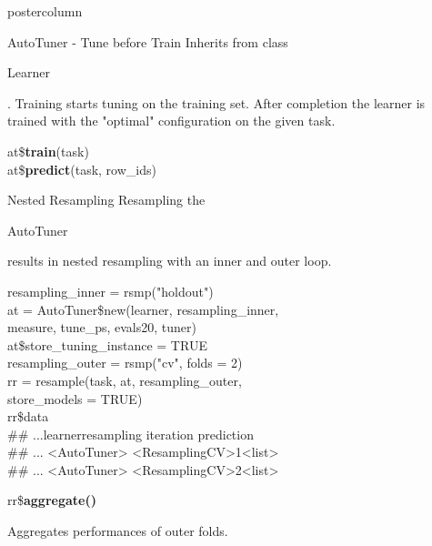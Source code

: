 \documentclass{beamer}
\newcommand{\codeinline}[1]{\begin{codeboxinline}#1\end{codeboxinline}}
\newcommand{\monospace}[1]{\multido{}{#1}{\space}}
\begin{document}
\begin{frame}[fragile]{}
\begin{columns}
\begin{column}{.245\textwidth}
\begin{beamercolorbox}[center]{postercolumn}
\begin{minipage}{.98\textwidth}
{\begin{myblock}{AutoTuner - Tune before Train}
							Inherits from class \codeinline{Learner}.
							Training starts tuning on the training set.
							After completion the learner is trained with the "optimal" configuration on the given task.
							\\
							\begin{codeboxmultiline}[width=16.5cm]
								at\$\textbf{train}(task)\\
								at\$\textbf{predict}(task, row\_ids)
							\end{codeboxmultiline}
						\end{myblock}
						\begin{myblock}{Nested Resampling}
							Resampling the \codeinline{AutoTuner} results in nested resampling with an inner and outer loop.
							\\
							\begin{codeboxexample}
								{\scriptsize
									resampling\_inner = rsmp("holdout")
									\vspace{1em}
									\\
									at = AutoTuner\$new(learner, resampling\_inner, \\
									\hspace*{1ex}measure, tune\_ps, evals20, tuner) \\
									at\$store\_tuning\_instance = TRUE
									\vspace{1em}
									\\
									resampling\_outer = rsmp("cv", folds = 2)\\
									rr = resample(task, at, resampling\_outer, \\
									\hspace*{1ex}store\_models = TRUE)
									\vspace{1em}
									\\
									rr\$data\\
									\#\# ...\monospace{3}learner\monospace{5}resampling iteration
									prediction\\
									\#\# ... <AutoTuner> <ResamplingCV>\monospace{9}1\monospace{5}<list>\\
									\#\# ... <AutoTuner> <ResamplingCV>\monospace{9}2\monospace{5}<list>}
							\end{codeboxexample}
							\vspace{1em}
							\begin{codebox}
								rr\$\textbf{aggregate()}
							\end{codebox}
							Aggregates performances of outer folds.
							\\

\end{myblock}}
\end{minipage}
\end{beamercolorbox}
\end{column}
\end{columns}
\end{frame}
\end{document}

